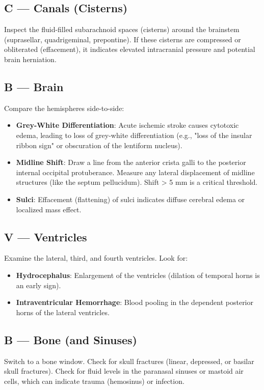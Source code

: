 \subsection*{C --- Canals (Cisterns)}
Inspect the fluid-filled subarachnoid spaces (cisterns) around the brainstem (suprasellar, quadrigeminal, prepontine). If these cisterns are compressed or obliterated (effacement), it indicates elevated intracranial pressure and potential brain herniation.

\subsection*{B --- Brain}
Compare the hemispheres side-to-side:
\begin{itemize}
    \item \textbf{Grey-White Differentiation}: Acute ischemic stroke causes cytotoxic edema, leading to loss of grey-white differentiation (e.g., "loss of the insular ribbon sign" or obscuration of the lentiform nucleus).
    \item \textbf{Midline Shift}: Draw a line from the anterior crista galli to the posterior internal occipital protuberance. Measure any lateral displacement of midline structures (like the septum pellucidum). Shift > 5 mm is a critical threshold.
    \item \textbf{Sulci}: Effacement (flattening) of sulci indicates diffuse cerebral edema or localized mass effect.
\end{itemize}

\subsection*{V --- Ventricles}
Examine the lateral, third, and fourth ventricles. Look for:
\begin{itemize}
    \item \textbf{Hydrocephalus}: Enlargement of the ventricles (dilation of temporal horns is an early sign).
    \item \textbf{Intraventricular Hemorrhage}: Blood pooling in the dependent posterior horns of the lateral ventricles.
\end{itemize}

\subsection*{B --- Bone (and Sinuses)}
Switch to a bone window. Check for skull fractures (linear, depressed, or basilar skull fractures). Check for fluid levels in the paranasal sinuses or mastoid air cells, which can indicate trauma (hemosinus) or infection.



